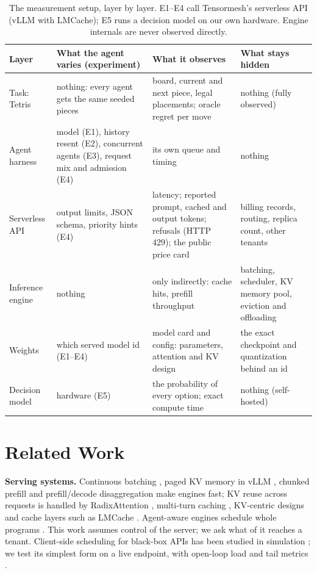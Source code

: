 \documentclass{article}
\begin{document}
\begin{table}[t]
\caption{The measurement setup, layer by layer. E1--E4 call Tensormesh's serverless API (vLLM with LMCache); E5 runs a decision model on our own hardware. Engine internals are never observed directly.}
\label{tab:setup}
\centering\small
\begin{tabularx}{\textwidth}{@{}>{\raggedright\arraybackslash}p{2.6cm}LLL@{}}
\toprule
Layer & What the agent varies (experiment) & What it observes & What stays hidden \\
\midrule
Task: Tetris & nothing: every agent gets the same seeded pieces & board, current and next piece, legal placements; oracle regret per move & nothing (fully observed) \\
Agent harness & model (E1), history resent (E2), concurrent agents (E3), request mix and admission (E4) & its own queue and timing & nothing \\
Serverless API & output limits, JSON schema, priority hints (E4) & latency; reported prompt, cached and output tokens; refusals (HTTP 429); the public price card & billing records, routing, replica count, other tenants \\
Inference engine & nothing & only indirectly: cache hits, prefill throughput & batching, scheduler, KV memory pool, eviction and offloading \\
Weights & which served model id (E1--E4) & model card and config: parameters, attention and KV design & the exact checkpoint and quantization behind an id \\
Decision model & hardware (E5) & the probability of every option; exact compute time & nothing (self-hosted) \\
\bottomrule
\end{tabularx}
\end{table}

\section{Related Work}

\textbf{Serving systems.} Continuous batching \citep{orca}, paged KV memory in vLLM \citep{vllm}, chunked prefill \citep{sarathi} and prefill/decode disaggregation \citep{distserve,splitwise} make engines fast; KV reuse across requests is handled by RadixAttention \citep{sglang}, multi-turn caching \citep{cachedattn}, KV-centric designs \citep{mooncake} and cache layers such as LMCache \citep{lmcache}. Agent-aware engines schedule whole programs \citep{autellix}. This work assumes control of the server; we ask what of it reaches a tenant. Client-side scheduling for black-box APIs has been studied in simulation \citep{yuan}; we test its simplest form on a live endpoint, with open-loop load \citep{schroeder} and tail metrics \citep{tail}.
\end{document}
